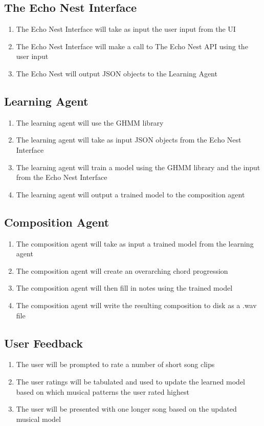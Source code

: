\documentclass{article}
\begin{document}
\subsection{The Echo Nest Interface}
\begin{enumerate}
\item The Echo Nest Interface will take as input the user input from the UI
\item The Echo Nest Interface will make a call to The Echo Nest API using the user input
\item The Echo Nest will output JSON objects to the Learning Agent
\end{enumerate}

\subsection{Learning Agent}
\begin{enumerate}
\item The learning agent will use the GHMM library
\item The learning agent will take as input JSON objects from the Echo Nest Interface
\item The learning agent will train a model \cite{GHMM} using the GHMM library and the input from the Echo Nest Interface
\item The learning agent will output a trained model to the composition agent
\end{enumerate}

\subsection{Composition Agent}
\begin{enumerate}
\item The composition agent will take as input a trained model from the learning agent
\item The composition agent will create an overarching chord progression
\item The composition agent will then fill in notes using the trained model
\item The composition agent will write the resulting composition to disk as a .wav file
\end{enumerate}

\subsection{User Feedback}
\begin{enumerate}
\item The user will be prompted to rate a number of short song clips
\item The user ratings will be tabulated and used to update the learned model based on which musical patterns the user rated highest
\item The user will be presented with one longer song based on the updated musical model
\end{enumerate}
\end{document}
